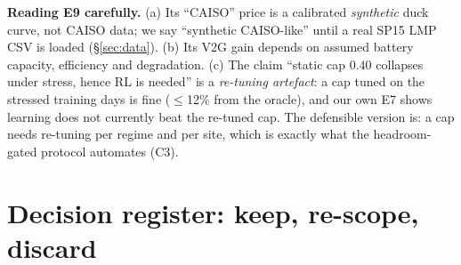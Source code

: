 \documentclass[10pt,a4paper]{article}
\begin{document}
\normalsize
\noindent\textbf{Reading E9 carefully.} (a) Its ``CAISO'' price is a calibrated \emph{synthetic} duck curve, not CAISO data;
we say ``synthetic CAISO-like'' until a real SP15 LMP CSV is loaded (\S\ref{sec:data}). (b) Its V2G gain depends on assumed
battery capacity, efficiency and degradation. (c) The claim ``static cap $0.40$ collapses under stress, hence RL is
needed'' is a \emph{re-tuning artefact}: a cap tuned on the stressed training days is fine ($\le$12\% from the oracle), and
our own E7 shows learning does not currently beat the re-tuned cap. The defensible version is: a cap needs re-tuning per
regime and per site, which is exactly what the headroom-gated protocol automates (C3).

\section{Decision register: keep, re-scope, discard}
\small
\end{document}
